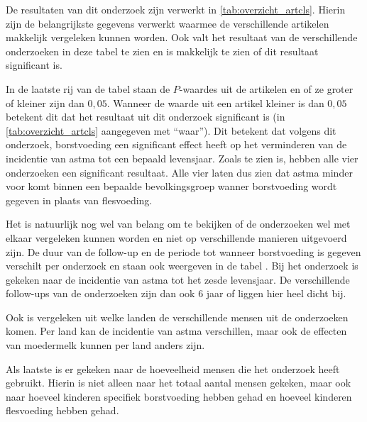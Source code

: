 \documentclass[table,abstract=true]{scrartcl}
\begin{document}
De resultaten van dit onderzoek zijn verwerkt in \cref{tab:overzicht_artcls}. Hierin zijn de belangrijkste gegevens verwerkt waarmee de verschillende artikelen makkelijk vergeleken kunnen worden. Ook valt het resultaat van de verschillende onderzoeken in deze tabel te zien en is makkelijk te zien of dit resultaat significant is. 

In de laatste rij van de tabel staan de $P$-waardes uit de artikelen en of ze groter of kleiner zijn dan $0,05$. Wanneer de waarde uit een artikel kleiner is dan $0,05$ betekent dit dat het resultaat uit dit onderzoek significant is (in \cref{tab:overzicht_artcls} aangegeven met “waar”). Dit betekent dat volgens dit onderzoek, borstvoeding een significant effect heeft op het verminderen van de incidentie van astma tot een bepaald levensjaar. Zoals te zien is, hebben alle vier onderzoeken een significant resultaat. Alle vier laten dus zien dat astma minder voor komt binnen een bepaalde bevolkingsgroep wanner borstvoeding wordt gegeven in plaats van flesvoeding. 

Het is natuurlijk nog wel van belang om te bekijken of de onderzoeken wel met elkaar vergeleken kunnen worden en niet op verschillende manieren uitgevoerd zijn. De duur van de follow-up en de periode tot wanneer borstvoeding is gegeven verschilt per onderzoek en staan ook weergeven in de tabel . Bij het onderzoek is  gekeken naar de incidentie van astma tot het zesde levensjaar. De verschillende follow-ups van de onderzoeken zijn dan ook 6 jaar of liggen hier heel dicht bij. 

Ook is vergeleken uit welke landen de verschillende mensen uit de onderzoeken komen. Per land kan de incidentie van astma verschillen, maar ook de effecten van moedermelk kunnen per land anders zijn. 

Als laatste is er gekeken naar de hoeveelheid mensen die het onderzoek heeft gebruikt. Hierin is niet alleen naar het totaal aantal mensen gekeken, maar ook naar hoeveel kinderen specifiek borstvoeding hebben gehad en hoeveel kinderen flesvoeding hebben gehad. 
\end{document}
